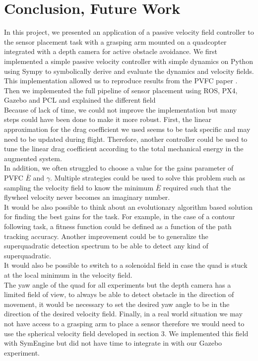 \section{Conclusion, Future Work}
In this project, we presented an application of a passive velocity field controller to the sensor placement task with a grasping arm mounted on a quadcopter integrated with a depth camera for active obstacle avoidance. 
We first implemented a simple passive velocity controller with simple dynamics on Python using Sympy to symbolically derive and evaluate the dynamics and velocity fields. 
This implementation allowed us to reproduce results from the PVFC paper \cite{li1999passive}.
Then we implemented the full pipeline of sensor placement using ROS, PX4, Gazebo and PCL and explained the different field\\

Because of lack of time, we could not improve the implementation but many steps could have been done to make it more robust.
First, the linear approximation for the drag coefficient we used seems to be task specific and may need to be updated during flight. Therefore, another controller could be used to tune the linear drag coefficient 
according to the total mechanical energy in the augmented system.\\
In addition, we often struggled to choose a value for the gains parameter of PVFC $\bar{E}$ and $\gamma$. Multiple strategies could be used to solve this problem such as sampling the velocity field to know the minimum $\bar{E}$ required 
such that the flywheel velocity never becomes an imaginary number. \\
It would be also possible to think about an evolutionary algorithm based solution for finding the best gains for the task. For example, in the case of a contour following task, a fitness function could be defined as a function of the path tracking accuracy.
Another improvement could be to generalize the superquadratic detection spectrum to be able to detect any kind of superquadratic.\\
It would also be possible to switch to a solenoidal field in case the quad is stuck at the local minimum in the velocity field.\\
The yaw angle of the quad for all experiments but the depth camera has a limited field of view, to always be able to detect obstacle in the direction of movement, it would be necessary to set the desired yaw angle to be in the direction of the desired velocity field.
Finally, in a real world situation we may not have access to a grasping arm to place a sensor therefore we would need to use the spherical velocity field developed in section 3. We implemented this field with SymEngine but did not have time to integrate in with our Gazebo experiment. 

